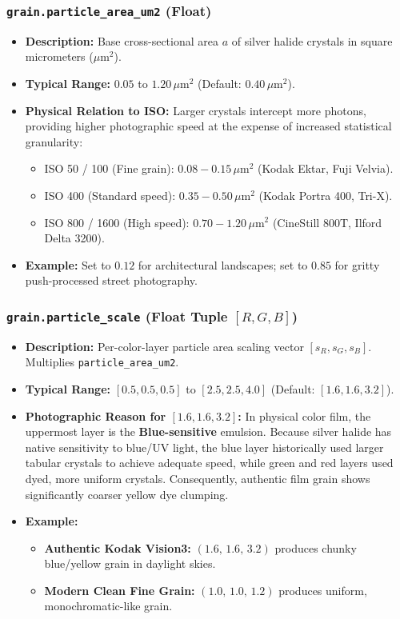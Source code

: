 \documentclass[11pt,a4paper]{article}
\begin{document}
\subsubsection{\texttt{grain.particle\_area\_um2} (Float)}
\begin{itemize}[leftmargin=*]
    \item \textbf{Description:} Base cross-sectional area $a$ of silver halide crystals in square micrometers ($\mu\text{m}^2$).
    \item \textbf{Typical Range:} $0.05$ to $1.20\,\mu\text{m}^2$ (Default: $0.40\,\mu\text{m}^2$).
    \item \textbf{Physical Relation to ISO:} Larger crystals intercept more photons, providing higher photographic speed at the expense of increased statistical granularity:
    \begin{itemize}
        \item ISO 50 / 100 (Fine grain): $0.08 - 0.15\,\mu\text{m}^2$ (Kodak Ektar, Fuji Velvia).
        \item ISO 400 (Standard speed): $0.35 - 0.50\,\mu\text{m}^2$ (Kodak Portra 400, Tri-X).
        \item ISO 800 / 1600 (High speed): $0.70 - 1.20\,\mu\text{m}^2$ (CineStill 800T, Ilford Delta 3200).
    \end{itemize}
    \item \textbf{Example:} Set to $0.12$ for architectural landscapes; set to $0.85$ for gritty push-processed street photography.
\end{itemize}

\subsubsection{\texttt{grain.particle\_scale} (Float Tuple $[R, G, B]$)}
\begin{itemize}[leftmargin=*]
    \item \textbf{Description:} Per-color-layer particle area scaling vector $[s_R, s_G, s_B]$. Multiplies \texttt{particle\_area\_um2}.
    \item \textbf{Typical Range:} $[0.5, 0.5, 0.5]$ to $[2.5, 2.5, 4.0]$ (Default: $[1.6, 1.6, 3.2]$).
    \item \textbf{Photographic Reason for $[1.6, 1.6, 3.2]$:} In physical color film, the uppermost layer is the \textbf{Blue-sensitive} emulsion. Because silver halide has native sensitivity to blue/UV light, the blue layer historically used larger tabular crystals to achieve adequate speed, while green and red layers used dyed, more uniform crystals. Consequently, authentic film grain shows significantly coarser yellow dye clumping.
    \item \textbf{Example:}
    \begin{itemize}
        \item \textbf{Authentic Kodak Vision3:} $(1.6,\, 1.6,\, 3.2)$ produces chunky blue/yellow grain in daylight skies.
        \item \textbf{Modern Clean Fine Grain:} $(1.0,\, 1.0,\, 1.2)$ produces uniform, monochromatic-like grain.
    \end{itemize}
\end{itemize}
\end{document}
